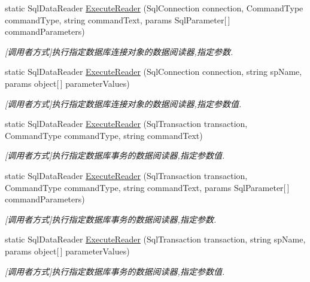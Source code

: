 \begin{DoxyCompactItemize}
static Sql\+Data\+Reader \hyperlink{class_x_c_l_net_tools_1_1_data_base_1_1_m_s_s_q_l_1_1_sql_helper_a9e6aa775608f4e6cbf9c69d17ad97d4a}{Execute\+Reader} (Sql\+Connection connection, Command\+Type command\+Type, string command\+Text, params Sql\+Parameter\mbox{[}$\,$\mbox{]} command\+Parameters)
\begin{DoxyCompactList}\small\item\em \mbox{[}调用者方式\mbox{]}执行指定数据库连接对象的数据阅读器,指定参数. \end{DoxyCompactList}\item 
static Sql\+Data\+Reader \hyperlink{class_x_c_l_net_tools_1_1_data_base_1_1_m_s_s_q_l_1_1_sql_helper_a7a3f47f46b6c0ddcb97b6c8f0fb04474}{Execute\+Reader} (Sql\+Connection connection, string sp\+Name, params object\mbox{[}$\,$\mbox{]} parameter\+Values)
\begin{DoxyCompactList}\small\item\em \mbox{[}调用者方式\mbox{]}执行指定数据库连接对象的数据阅读器,指定参数值. \end{DoxyCompactList}\item 
static Sql\+Data\+Reader \hyperlink{class_x_c_l_net_tools_1_1_data_base_1_1_m_s_s_q_l_1_1_sql_helper_a6b4569da3e5c4d06dd91034f44fe259d}{Execute\+Reader} (Sql\+Transaction transaction, Command\+Type command\+Type, string command\+Text)
\begin{DoxyCompactList}\small\item\em \mbox{[}调用者方式\mbox{]}执行指定数据库事务的数据阅读器,指定参数值. \end{DoxyCompactList}\item 
static Sql\+Data\+Reader \hyperlink{class_x_c_l_net_tools_1_1_data_base_1_1_m_s_s_q_l_1_1_sql_helper_af9eb35d307bdf9d3e95b9c8843fe90b4}{Execute\+Reader} (Sql\+Transaction transaction, Command\+Type command\+Type, string command\+Text, params Sql\+Parameter\mbox{[}$\,$\mbox{]} command\+Parameters)
\begin{DoxyCompactList}\small\item\em \mbox{[}调用者方式\mbox{]}执行指定数据库事务的数据阅读器,指定参数. \end{DoxyCompactList}\item 
static Sql\+Data\+Reader \hyperlink{class_x_c_l_net_tools_1_1_data_base_1_1_m_s_s_q_l_1_1_sql_helper_a804fbff55febd149c51cbb0d5f1cd044}{Execute\+Reader} (Sql\+Transaction transaction, string sp\+Name, params object\mbox{[}$\,$\mbox{]} parameter\+Values)
\begin{DoxyCompactList}\small\item\em \mbox{[}调用者方式\mbox{]}执行指定数据库事务的数据阅读器,指定参数值. \end{DoxyCompactList}\item 

\end{DoxyCompactItemize}
